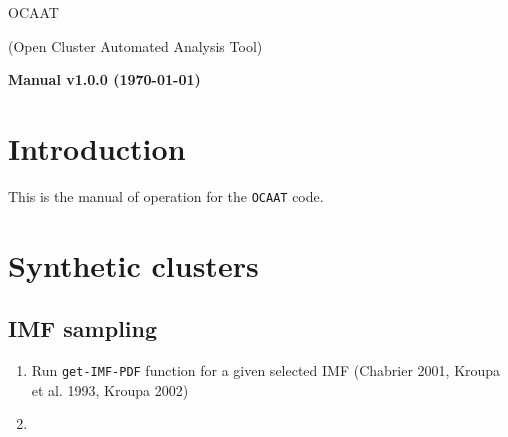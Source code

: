 \documentclass[10pt]{article}
\begin{document}
\begin{center}
\begin{Huge}
OCAAT\\
\end{Huge}
{\huge (Open Cluster Automated Analysis Tool)\\}
\vspace{1cm}
\begin{Large}
\textbf{Manual v1.0.0 (\today)}
\end{Large}
\end{center}

\clearpage

\section{Introduction}
This is the manual of operation for the \texttt{OCAAT} code.

\section{Synthetic clusters}

\subsection{IMF sampling}

\begin{enumerate}
\item Run \texttt{get-IMF-PDF} function for a given selected IMF (Chabrier 2001, Kroupa et al. 1993,
Kroupa 2002)
\item 
\end{enumerate}
\end{document}
